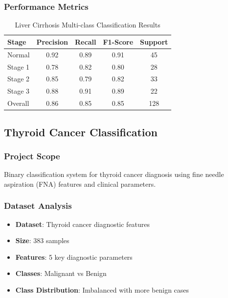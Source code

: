 \documentclass[12pt, a4paper]{article}
\begin{document}
\subsubsection{Performance Metrics}
\begin{table}[H]
    \centering
    \begin{tabular}{@{}lcccc@{}}
        \toprule
        Stage   & Precision & Recall & F1-Score & Support \\
        \midrule
        Normal  & 0.92      & 0.89   & 0.91     & 45      \\
        Stage 1 & 0.78      & 0.82   & 0.80     & 28      \\
        Stage 2 & 0.85      & 0.79   & 0.82     & 33      \\
        Stage 3 & 0.88      & 0.91   & 0.89     & 22      \\
        \midrule
        Overall & 0.86      & 0.85   & 0.85     & 128     \\
        \bottomrule
    \end{tabular}
    \caption{Liver Cirrhosis Multi-class Classification Results}
\end{table}

\subsection{Thyroid Cancer Classification}

\subsubsection{Project Scope}
Binary classification system for thyroid cancer diagnosis using fine needle aspiration (FNA) features and clinical parameters.

\subsubsection{Dataset Analysis}
\begin{itemize}
    \item \textbf{Dataset}: Thyroid cancer diagnostic features
    \item \textbf{Size}: 383 samples
    \item \textbf{Features}: 5 key diagnostic parameters
    \item \textbf{Classes}: Malignant vs Benign
    \item \textbf{Class Distribution}: Imbalanced with more benign cases
\end{itemize}
\end{document}
